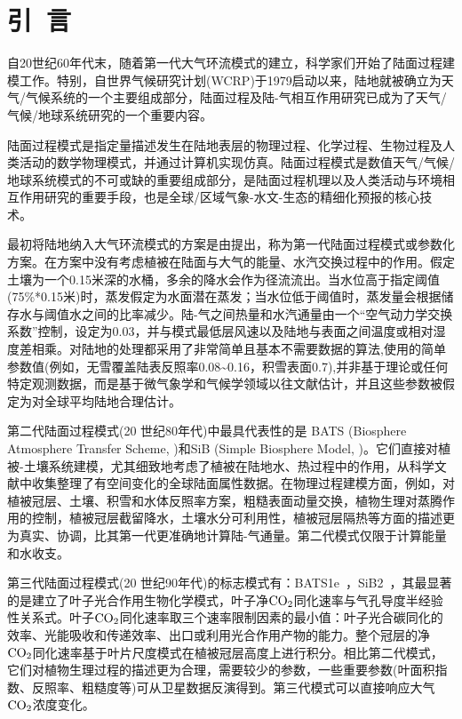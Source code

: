 \chapter{引~言}

自20世纪60年代末，随着第一代大气环流模式的建立，科学家们开始了陆面过程建模工作。特别，自世界气候研究计划(WCRP)于1979启动以来，陆地就被确立为天气/气候系统的一个主要组成部分，陆面过程及陆-气相互作用研究已成为了天气/气候/地球系统研究的一个重要内容。

陆面过程模式是指定量描述发生在陆地表层的物理过程、化学过程、生物过程及人类活动的数学物理模式，并通过计算机实现仿真。陆面过程模式是数值天气/气候/地球系统模式的不可或缺的重要组成部分，是陆面过程机理以及人类活动与环境相互作用研究的重要手段，也是全球/区域气象-水文-生态的精细化预报的核心技术。

最初将陆地纳入大气环流模式的方案是由\citet{manabe1969ClimateOceanCirculation}提出，称为第一代陆面过程模式或参数化方案。在方案中没有考虑植被在陆面与大气的能量、水汽交换过程中的作用。假定土壤为一个0.15米深的水桶，多余的降水会作为径流流出。当水位高于指定阈值(75\%*0.15米)时，蒸发假定为水面潜在蒸发；当水位低于阈值时，蒸发量会根据储存水与阈值水之间的比率减少。陆-气之间热量和水汽通量由一个“空气动力学交换系数”控制，设定为0.03，并与模式最低层风速以及陆地与表面之间温度或相对湿度差相乘。对陆地的处理都采用了非常简单且基本不需要数据的算法,使用的简单参数值(例如，无雪覆盖陆表反照率0.08\textasciitilde0.16，积雪表面0.7),并非基于理论或任何特定观测数据，而是基于微气象学和气候学领域以往文献估计，并且这些参数被假定为对全球平均陆地合理估计。

第二代陆面过程模式(20 世纪80年代)中最具代表性的是 BATS (Biosphere Atmosphere Transfer Scheme, \citet{dickinson1986biosphere})和SiB (Simple Biosphere Model, \citet{sellers1986SimpleBiosphereModel})。它们直接对植被-土壤系统建模，尤其细致地考虑了植被在陆地水、热过程中的作用，从科学文献中收集整理了有空间变化的全球陆面属性数据。在物理过程建模方面，例如，对植被冠层、土壤、积雪和水体反照率方案，粗糙表面动量交换，植物生理对蒸腾作用的控制，植被冠层截留降水，土壤水分可利用性，植被冠层隔热等方面的描述更为真实、协调，比其第一代更准确地计算陆-气通量。第二代模式仅限于计算能量和水收支。

第三代陆面过程模式(20 世纪90年代)的标志模式有：BATS1e~\citep{dickinson1993biosphere}，SiB2~\citep{sellers1996revised}，其最显著的是建立了叶子光合作用生物化学模式，叶子净$\rm CO_2$同化速率与气孔导度半经验性关系式。叶子$\rm CO_2$同化速率取三个速率限制因素的最小值：叶子光合碳同化的效率、光能吸收和传递效率、出口或利用光合作用产物的能力。整个冠层的净$\rm CO_2$同化速率基于叶片尺度模式在植被冠层高度上进行积分。相比第二代模式，它们对植物生理过程的描述更为合理，需要较少的参数，一些重要参数(叶面积指数、反照率、粗糙度等)可从卫星数据反演得到。第三代模式可以直接响应大气$\rm CO_2$浓度变化。


